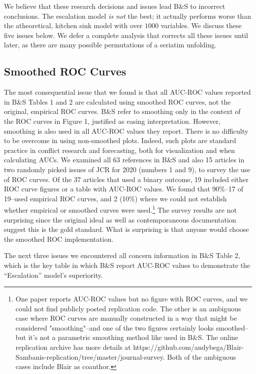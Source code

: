 \documentclass[
]{article}
\begin{document}
We believe that these research decisions and issues lead B\&S to incorrect conclusions. The escalation model \emph{is not} the best; it actually performs worse than the atheoretical, kitchen sink model with over \(1000\) variables. We discuss these five issues below. We defer a complete analysis that corrects all these issues until later, as there are many possible permutations of a seriatim unfolding.

\hypertarget{smoothed-roc-curves}{%
\subsection{Smoothed ROC Curves}\label{smoothed-roc-curves}}

The most consequential issue that we found is that all AUC-ROC values reported in B\&S Tables 1 and 2 are calculated using smoothed ROC curves, not the original, empirical ROC curves. B\&S refer to smoothing only in the context of the ROC curves in Figure 1, justified as easing interpretation. However, smoothing is also used in all AUC-ROC values they report. There is no difficulty to be overcome in using non-smoothed plots. Indeed, such plots are standard practice in conflict research and forecasting, both for visualization and when calculating AUCs. We examined all 63 references in B\&S and also 15 articles in two randomly picked issues of JCR for 2020 (numbers 1 and 9), to survey the use of ROC curves. Of the 37 articles that used a binary outcome, 19 included either ROC curve figures or a table with AUC-ROC values. We found that 90\%--17 of 19--used empirical ROC curves, and 2 (10\%) where we could not establish whether empirical or smoothed curves were used.\footnote{One paper reports AUC-ROC values but no figure with ROC curves, and we could not find publicly posted replication code. The other is an ambiguous case where ROC curves are manually constructed in a way that might be considered "smoothing"--and one of the two figures certainly looks smoothed--but it's not a parametric smoothing method like used in B\&S. The online replication archive has more details at https://github.com/andybega/Blair-Sambanis-replication/tree/master/journal-survey. Both of the ambiguous cases include Blair as coauthor.} The survey results are not surprising since the original ideal as well as contemporaneous documentation suggest this is the gold standard. What is surprising is that anyone would choose the smoothed ROC implementation.

The next three issues we encountered all concern information in B\&S Table 2, which is the key table in which B\&S report AUC-ROC values to demonstrate the ``Escalation'' model's superiority.
\end{document}
